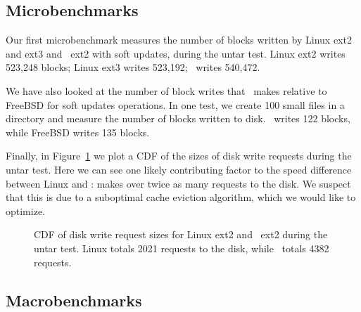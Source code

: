 \begin{comment}
\begin{figure}[htb]
\vspace{-0.5\baselineskip}
\centering{
\texttt{[image: rb\_chdesc\_size]}
}
\vspace{-0.5\baselineskip}
\caption{\label{fig:patchsize-histo} \Rb\ \chdesc\ size histogram for a sample
workload (extracting a large archive into ext2). All the \chdescs\ larger than
63 bytes have been optimized into \nrb\ \chdescs. \Rb\ \chdescs\ 4 bytes and
smaller account for about 51\% of all \rb\ \chdescs.}
\end{figure}
\end{comment}

\subsection {Microbenchmarks}
Our first microbenchmark measures the number of blocks written by Linux ext2
and ext3 and \Kudos\ ext2 with soft updates, during the untar test. Linux ext2
writes 523,248 blocks; Linux ext3 writes 523,192; \Kudos\ writes 540,472.

We have also looked at the number of block writes that \Kudos\ makes relative
to FreeBSD for soft updates operations. In one test, we create 100 small files
in a directory and measure the number of blocks written to disk. \Kudos\ writes
122 blocks, while FreeBSD writes 135 blocks.

Finally, in Figure~\ref{fig:mergereq-cdf} we plot a CDF of the sizes of disk
write requests during the untar test. Here we can see one likely contributing
factor to the speed difference between Linux and \Kudos: \Kudos makes over
twice as many requests to the disk. We suspect that this is due to a suboptimal
cache eviction algorithm, which we would like to optimize.

\begin{figure}[htb]
\vspace{-0.5\baselineskip}
\vspace{-0.5\baselineskip}
\caption{\label{fig:mergereq-cdf} CDF of disk write request sizes for
  Linux ext2 and \Kudos\ ext2 during the untar test. Linux totals 2021
  requests to the disk, while \Kudos\ totals 4382 requests.}
\end{figure}

\subsection {Macrobenchmarks}
\label{sec:eval:macro}

